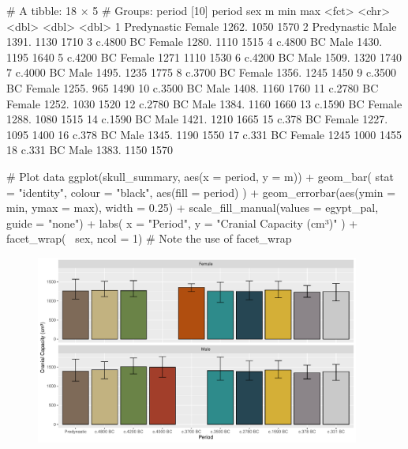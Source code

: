 \begin{outR}
# A tibble: 18 × 5
# Groups:   period [10]
   period      sex        m   min   max
   <fct>       <chr>  <dbl> <dbl> <dbl>
 1 Predynastic Female 1262.  1050  1570
 2 Predynastic Male   1391.  1130  1710
 3 c.4800 BC   Female 1280.  1110  1515
 4 c.4800 BC   Male   1430.  1195  1640
 5 c.4200 BC   Female 1271   1110  1530
 6 c.4200 BC   Male   1509.  1320  1740
 7 c.4000 BC   Male   1495.  1235  1775
 8 c.3700 BC   Female 1356.  1245  1450
 9 c.3500 BC   Female 1255.   965  1490
10 c.3500 BC   Male   1408.  1160  1760
11 c.2780 BC   Female 1252.  1030  1520
12 c.2780 BC   Male   1384.  1160  1660
13 c.1590 BC   Female 1288.  1080  1515
14 c.1590 BC   Male   1421.  1210  1665
15 c.378 BC    Female 1227.  1095  1400
16 c.378 BC    Male   1345.  1190  1550
17 c.331 BC    Female 1245   1000  1455
18 c.331 BC    Male   1383.  1150  1570
\end{outR}


\begin{inR}
# Plot data
ggplot(skull_summary, aes(x = period, y = m)) +
  geom_bar(
    stat = "identity",
    colour = "black",
    aes(fill = period)
  ) +
  geom_errorbar(aes(ymin = min, ymax = max), width = 0.25) +
  scale_fill_manual(values = egypt_pal, guide = "none") +
  labs(
    x = "Period",
    y = "Cranial Capacity (cm³)"
  ) +
  facet_wrap(~ sex, ncol = 1) # Note the use of facet_wrap
\end{inR}

\vspace{2em}

\begin{figure}[H]
\includegraphics[width = 0.95\textwidth]{graphics/ch3Figs/bar_8.pdf}
\end{figure}

